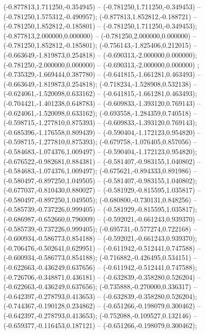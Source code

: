 (-0.877813,1.711250,-0.354945) -- (-0.781250,1.711250,-0.349453) -- (-0.781250,1.575312,-0.490957);
 (-0.877813,1.852812,-0.188721) -- (-0.781250,1.852812,-0.185801) -- (-0.781250,1.711250,-0.349453);
 (-0.877813,2.000000,0.000000) -- (-0.781250,2.000000,0.000000) -- (-0.781250,1.852812,-0.185801);
 (-0.756143,-1.825406,0.212015) -- (-0.663649,-1.819873,0.254818) -- (-0.690313,-2.000000,0.000000);
 (-0.781250,-2.000000,0.000000) -- (-0.690313,-2.000000,0.000000) ;
 (-0.735329,-1.669444,0.387780) -- (-0.641815,-1.661281,0.463493) -- (-0.663649,-1.819873,0.254818);
 (-0.718234,-1.528908,0.532138) -- (-0.624061,-1.520098,0.633162) -- (-0.641815,-1.661281,0.463493);
 (-0.704421,-1.401238,0.648783) -- (-0.609833,-1.393120,0.769143) -- (-0.624061,-1.520098,0.633162);
 (-0.693558,-1.284359,0.740518) -- (-0.598715,-1.277810,0.875393) -- (-0.609833,-1.393120,0.769143);
 (-0.685396,-1.176558,0.809439) -- (-0.590404,-1.172123,0.954820) -- (-0.598715,-1.277810,0.875393);
 (-0.679758,-1.076405,0.857056) -- (-0.584683,-1.074376,1.009497) -- (-0.590404,-1.172123,0.954820);
 (-0.676522,-0.982681,0.884381) -- (-0.581407,-0.983155,1.040802) -- (-0.584683,-1.074376,1.009497);
 (-0.675621,-0.894333,0.891986) -- (-0.580497,-0.897250,1.049505) -- (-0.581407,-0.983155,1.040802);
 (-0.677037,-0.810430,0.880027) -- (-0.581929,-0.815595,1.035817) -- (-0.580497,-0.897250,1.049505);
 (-0.680800,-0.730131,0.848256) -- (-0.585739,-0.737226,0.999405) -- (-0.581929,-0.815595,1.035817);
 (-0.686987,-0.652660,0.796009) -- (-0.592021,-0.661243,0.939370) -- (-0.585739,-0.737226,0.999405);
 (-0.695731,-0.577274,0.722168) -- (-0.600934,-0.586773,0.854188) -- (-0.592021,-0.661243,0.939370);
 (-0.706476,-0.502641,0.629951) -- (-0.611942,-0.512441,0.747588) -- (-0.600934,-0.586773,0.854188);
 (-0.716882,-0.426495,0.534151) -- (-0.622663,-0.436249,0.637656) -- (-0.611942,-0.512441,0.747588);
 (-0.726706,-0.348871,0.436181) -- (-0.632839,-0.358280,0.526204) -- (-0.622663,-0.436249,0.637656);
 (-0.735888,-0.270000,0.336317) -- (-0.642397,-0.278793,0.413653) -- (-0.632839,-0.358280,0.526204);
 (-0.744367,-0.190128,0.234862) -- (-0.651266,-0.198079,0.300462) -- (-0.642397,-0.278793,0.413653);
 (-0.752088,-0.109527,0.132146) -- (-0.659377,-0.116453,0.187121) -- (-0.651266,-0.198079,0.300462);
